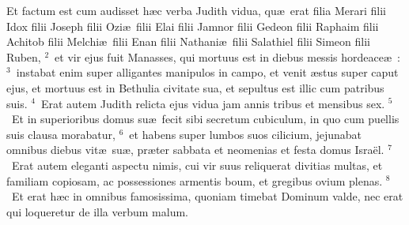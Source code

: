 \lettrine[lines=3,image=true,loversize=0.05,lraise=-0.03]{E}{}t factum est cum audisset h\ae c verba Judith vidua, qu\ae\ erat filia Merari filii Idox filii Joseph filii Ozi\ae\ filii Elai filii Jamnor filii Gedeon filii Raphaim filii Achitob filii Melchi\ae\ filii Enan filii Nathani\ae\ filii Salathiel filii Simeon filii Ruben,
${}^{2}$~et vir ejus fuit Manasses, qui mortuus est in diebus messis hordeace\ae~:
${}^{3}$~instabat enim super alligantes manipulos in campo, et venit \ae stus super caput ejus, et mortuus est in Bethulia civitate sua, et sepultus est illic cum patribus suis.
${}^{4}$~Erat autem Judith relicta ejus vidua jam annis tribus et mensibus sex.
${}^{5}$~Et in superioribus domus su\ae\ fecit sibi secretum cubiculum, in quo cum puellis suis clausa morabatur,
${}^{6}$~et habens super lumbos suos cilicium, jejunabat omnibus diebus vit\ae\ su\ae , pr\ae ter sabbata et neomenias et festa domus Isra\"el.
${}^{7}$~Erat autem eleganti aspectu nimis, cui vir suus reliquerat divitias multas, et familiam copiosam, ac possessiones armentis boum, et gregibus ovium plenas.
${}^{8}$~Et erat h\ae c in omnibus famosissima, quoniam timebat Dominum valde, nec erat qui loqueretur de illa verbum malum.


